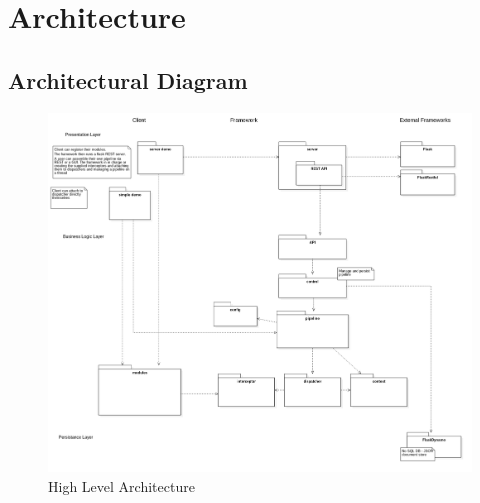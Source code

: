 \chapter{Architecture}

  \section{Architectural Diagram}
    \begin{figure}[H]
        \includegraphics[width = 1.2\linewidth]{diagrams/architecture.png}
        \caption{High Level Architecture}
        \label{fig:high_level_architecture}
      \end{figure}

